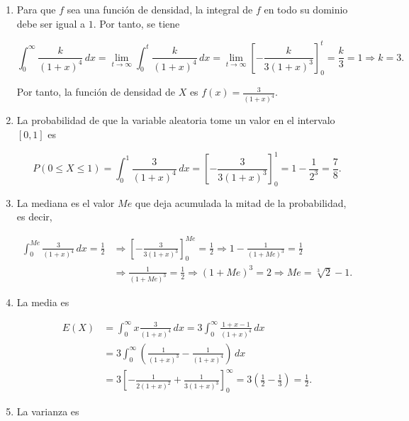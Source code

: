 \documentclass[
  spanish,
  a4paper,
]{scrreport}
\theoremstyle{definition}
\theoremstyle{remark}
\begin{document}
\begin{tcolorbox}[enhanced jigsaw, arc=.35mm, bottomrule=.15mm, bottomtitle=1mm, breakable, colback=white, colbacktitle=quarto-callout-tip-color!10!white, colframe=quarto-callout-tip-color-frame, coltitle=black, left=2mm, leftrule=.75mm, opacityback=0, opacitybacktitle=0.6, rightrule=.15mm, title=\textcolor{quarto-callout-tip-color}{\faLightbulb}\hspace{0.5em}{Solución}, titlerule=0mm, toprule=.15mm, toptitle=1mm]

\begin{enumerate}
\def\labelenumi{\alph{enumi}.}
\item
  Para que \(f\) sea una función de densidad, la integral de \(f\) en
  todo su dominio debe ser igual a \(1\). Por tanto, se tiene

  \[
  \int_0^{\infty} \frac{k}{(1+x)^4}\,dx = \lim_{t\to\infty} \int_0^{t} \frac{k}{(1+x)^4}\,dx = \lim_{t\to\infty}\left[-\frac{k}{3(1+x)^3}\right]_0^{t} = \frac{k}{3} = 1 \Rightarrow k = 3.
  \]

  Por tanto, la función de densidad de \(X\) es
  \(f(x) = \frac{3}{(1+x)^4}\).
\item
  La probabilidad de que la variable aleatoria tome un valor en el
  intervalo \([0,1]\) es

  \[
  P(0\leq X\leq 1) = \int_0^1 \frac{3}{(1+x)^4}\,dx = \left[-\frac{3}{3(1+x)^3}\right]_0^1 = 1 - \frac{1}{2^3} = \frac{7}{8}.
  \]
\item
  La mediana es el valor \(Me\) que deja acumulada la mitad de la
  probabilidad, es decir,

  \begin{align*}
  \int_0^{Me} \frac{3}{(1+x)^4}\,dx = \frac{1}{2} 
  &\Rightarrow \left[-\frac{3}{3(1+x)^3}\right]_0^{Me} = \frac{1}{2} 
  \Rightarrow 1 - \frac{1}{(1+Me)^3} = \frac{1}{2}\\ 
  &\Rightarrow \frac{1}{(1+Me)^3} = \frac{1}{2} \Rightarrow (1+Me)^3 = 2 \Rightarrow Me = \sqrt[3]{2} - 1.
  \end{align*}
\item
  La media es

  \begin{align*}
  E(X) 
  &= \int_0^{\infty} x\frac{3}{(1+x)^4}\,dx 
  = 3\int_0^{\infty} \frac{1+x-1}{(1+x)^4}\,dx \\
  &= 3\int_0^{\infty} \left(\frac{1}{(1+x)^3} - \frac{1}{(1+x)^4}\right)\,dx \\
  &= 3\left[-\frac{1}{2(1+x)^2} + \frac{1}{3(1+x)^3}\right]_0^{\infty}
  = 3\left(\frac{1}{2} - \frac{1}{3}\right)
  = \frac{1}{2}.
  \end{align*}
\item
  La varianza es


\end{enumerate}
\end{tcolorbox}
\end{document}
